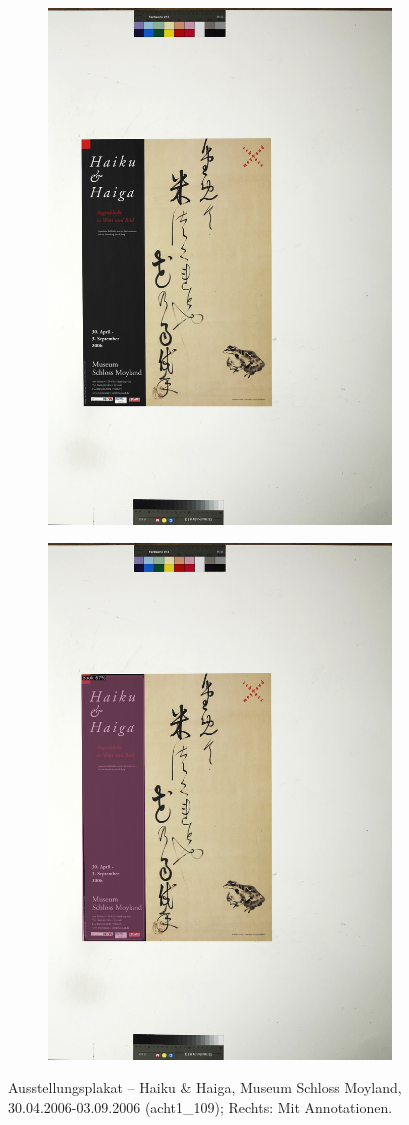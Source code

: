 \documentclass[a4paper,12pt,ngerman]{article}
\begin{document}
\newpage
\begin{landscape}
\begin{figure}[ht]
	\begin{subfigure}[b]{0.5\linewidth}
	\centering
	\includegraphics[height=\linewidth]{Abbildung_24_(acht1_109)}
	\end{subfigure}
	\begin{subfigure}[b]{0.5\linewidth}
	\centering
	\includegraphics[height=\linewidth]{Abbildung_24_(acht1_109)_with_detections}
	\end{subfigure}
	\caption{Ausstellungsplakat – Haiku \& Haiga, Museum Schloss Moyland, 30.04.2006-03.09.2006 (acht1\_109); Rechts: Mit Annotationen.}
\end{figure}
\end{landscape}
\end{document}
